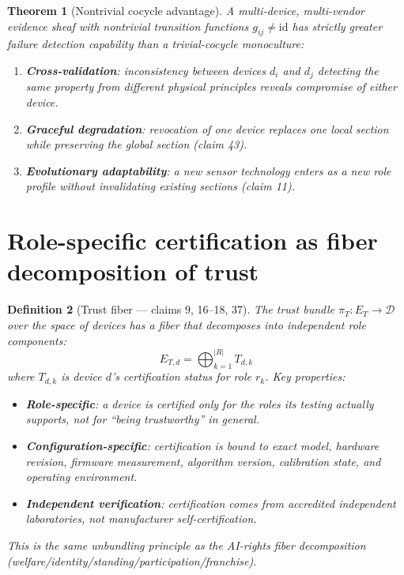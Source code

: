 \documentclass[11pt,a4paper]{article}
\newtheorem{definition}{Definition}[section]
\newtheorem{theorem}[definition]{Theorem}
\begin{document}
\begin{theorem}[Nontrivial cocycle advantage]
\label{thm:nontrivial}
A multi-device, multi-vendor evidence sheaf with nontrivial transition
functions $g_{ij} \neq \text{id}$ has strictly greater failure detection
capability than a trivial-cocycle monoculture:
\begin{enumerate}
\item \textbf{Cross-validation}: inconsistency between devices $d_i$ and
  $d_j$ detecting the same property from different physical principles
  reveals compromise of either device.
\item \textbf{Graceful degradation}: revocation of one device replaces
  one local section while preserving the global section (claim 43).
\item \textbf{Evolutionary adaptability}: a new sensor technology enters
  as a new role profile without invalidating existing sections (claim 11).
\end{enumerate}
\end{theorem}

\section{Role-specific certification as fiber decomposition of trust}
\label{sec:certification}

\begin{definition}[Trust fiber --- claims 9, 16--18, 37]
\label{def:trust-fiber}
The trust bundle $\pi_T : E_T \to \mathcal{D}$ over the space of devices
has a fiber that decomposes into independent role components:
\[
  E_{T,d} = \bigoplus_{k=1}^{|R|} T_{d,k}
\]
where $T_{d,k}$ is device $d$'s certification status for role $r_k$.
Key properties:
\begin{itemize}
\item \textbf{Role-specific}: a device is certified only for the roles
  its testing actually supports, not for ``being trustworthy'' in general.
\item \textbf{Configuration-specific}: certification is bound to exact
  model, hardware revision, firmware measurement, algorithm version,
  calibration state, and operating environment.
\item \textbf{Independent verification}: certification comes from
  accredited independent laboratories, not manufacturer self-certification.
\end{itemize}
This is the same unbundling principle as the AI-rights fiber decomposition
(welfare/identity/standing/participation/franchise).
\end{definition}
\end{document}
